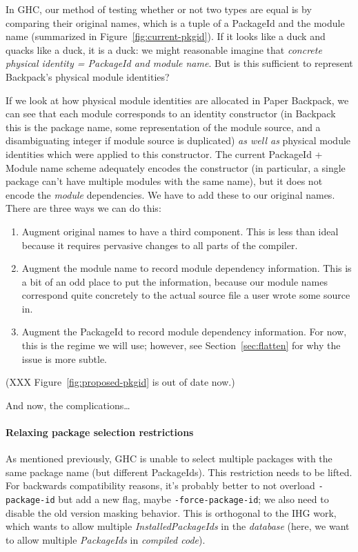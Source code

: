 \documentclass{article}
\begin{document}
In GHC, our method of testing whether or not two types are equal is by
comparing their original names, which is a tuple of a PackageId and the
module name (summarized in Figure~\ref{fig:current-pkgid}).  If it looks
like a duck and quacks like a duck, it is a duck: we might reasonable
imagine that \emph{concrete physical identity = PackageId and module
name}.  But is this sufficient to represent Backpack's physical module
identities?

If we look at how physical module identities are allocated in Paper Backpack,
we can see that each module corresponds to an identity constructor (in
Backpack this is the package name, some representation of the module
source, and a disambiguating integer if module source is duplicated)
\emph{as well as} physical module identities which were applied to
this constructor.  The current PackageId + Module name scheme adequately encodes
the constructor (in particular, a single package can't have multiple modules
with the same name), but it does not encode the \emph{module} dependencies.
We have to add these to our original names.  There are three ways we can do
this:

\begin{enumerate}
    \item Augment original names to have a third component.  This is less than ideal because it requires pervasive changes to all parts of the compiler.
    \item Augment the module name to record module dependency information.  This is a bit of an odd place to put the information, because our module names correspond quite concretely to the actual source file a user wrote some source in.
    \item Augment the PackageId to record module dependency information.  For now, this is the regime we will use; however, see Section~\ref{sec:flatten} for why the issue is more subtle.
\end{enumerate}

(XXX Figure~\ref{fig:proposed-pkgid} is out of date now.)

And now, the complications\ldots

\paragraph{Relaxing package selection restrictions}  As mentioned
previously, GHC is unable to select multiple packages with the same
package name (but different PackageIds).  This restriction needs to be
lifted.  For backwards compatibility reasons, it's probably better to
not overload \verb|-package-id| but add a new flag, maybe \verb|-force-package-id|;
we also need to disable the old version masking behavior.  This is orthogonal
to the IHG work, which wants to allow multiple \emph{InstalledPackageIds} in the
\emph{database} (here, we want to allow multiple \emph{PackageIds} in \emph{compiled code}).
\end{document}

